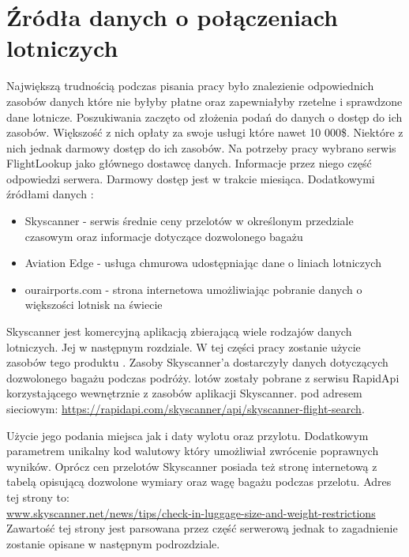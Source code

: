 \documentclass[12pt, twoside]{report}
\begin{document}
\section{Źródła danych o połączeniach lotniczych}
Największą trudnością podczas pisania pracy było znalezienie odpowiednich zasobów danych\add{,} które\delete{,} nie byłyby płatne oraz  zapewniałyby rzetelne i sprawdzone dane lotnicze. Poszukiwania zaczęto od złożenia podań do  danych o dostęp do ich zasobów. Większość z nich  opłaty za swoje usługi\add{,} które  nawet 10 000\$. Niektóre z nich  jednak darmowy dostęp do ich zasobów. Na potrzeby pracy wybrano serwis FlightLookup jako głównego dostawcę danych. Informacje przez niego  część odpowiedzi serwera. Darmowy dostęp jest  w trakcie miesiąca.
Dodatkowymi źródłami danych :
\begin{itemize}[noitemsep,topsep=0pt]
\item Skyscanner - serwis  średnie ceny przelotów w określonym przedziale czasowym oraz informacje dotyczące dozwolonego bagażu\add{,}
\item Aviation Edge - usługa chmurowa udostępniając dane o liniach lotniczych\add{,} 
\item ourairports.com - strona internetowa umożliwiając pobranie danych o większości lotnisk na świecie
\end{itemize}
Skyscanner jest komercyjną aplikacją zbierającą wiele rodzajów danych lotniczych. Jej  w następnym rozdziale. W tej części pracy zostanie  użycie zasobów tego produktu . Zasoby Skyscanner'a dostarczyły danych  dotyczących dozwolonego bagażu podczas podróży.  lotów zostały pobrane z serwisu RapidApi korzystającego wewnętrznie z zasobów aplikacji Skyscanner.  pod adresem sieciowym: \url{https://rapidapi.com/skyscanner/api/skyscanner-flight-search}.

Użycie jego   podania miejsca jak i daty wylotu oraz przylotu. Dodatkowym  parametrem  unikalny kod walutowy który umożliwiał zwrócenie poprawnych wyników. Oprócz cen przelotów Skyscanner posiada też stronę internetową z tabelą opisującą dozwolone wymiary oraz wagę bagażu podczas przelotu. Adres tej strony to:\\ \url{www.skyscanner.net/news/tips/check-in-luggage-size-and-weight-restrictions}\\
Zawartość tej strony jest parsowana przez część serwerową\add{,} jednak to zagadnienie zostanie opisane  w następnym podrozdziale.
\end{document}
